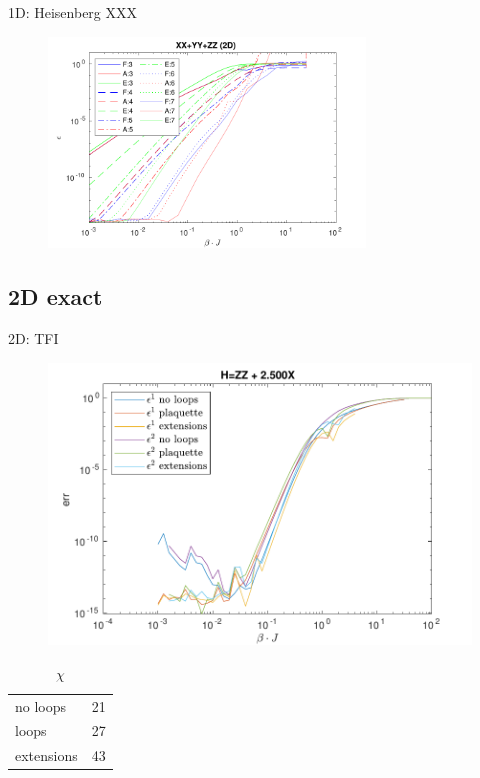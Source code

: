 \begin{frame}{1D: Heisenberg XXX}

    \begin{figure}
        \center
        \includegraphics[width=0.75\textwidth]{../Figuren/benchmarking/t_heis_XXX.pdf}
    \end{figure}

\end{frame}

\subsection{2D exact}

\begin{frame}{2D: TFI}

    \begin{minipage}{.75\textwidth}
        \begin{figure}
            \center
            \includegraphics[width=\textwidth]{../Figuren/benchmarking/2D_Err01_t_sing.pdf}
        \end{figure}
    \end{minipage}
    \begin{minipage}{.24\textwidth}
        \begin{table}[]
            \caption{$\chi$}
            \begin{tabular}{l|l }
                no loops   & 21 \\
                loops      & 27 \\
                extensions & 43 \\
            \end{tabular}
        \end{table}
    \end{minipage}
\end{frame}

